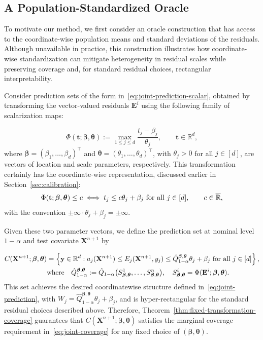 \subsection{A Population-Standardized Oracle}
\label{sec:pop-oracle}

To motivate our method, we first consider an oracle construction that has access to the coordinate-wise population means and standard deviations of the residuals.
Although unavailable in practice, this construction illustrates how coordinate-wise standardization can mitigate heterogeneity in residual scales while preserving coverage and, for standard residual choices, rectangular interpretability.

Consider prediction sets of the form in~\eqref{eq:joint-prediction-scalar}, obtained by transforming the vector-valued residuals $\mathbf E^i$ using the following family of scalarization maps:

\begin{equation}
\Phi(\mathbf t;\boldsymbol\beta,\boldsymbol\theta)
:=\max_{1\leq j\leq d}\frac{t_j-\beta_j}{\theta_j},
\qquad\mathbf t\in\mathbb R^d,
\label{eq:residual-transformation}
\end{equation}
where $\boldsymbol\beta=(\beta_1,\ldots,\beta_d)^\top$ and $\boldsymbol\theta=(\theta_1,\ldots,\theta_d)^\top$, with $\theta_j>0$ for all $j\in[d]$, are vectors of location and scale parameters, respectively.
This transformation certainly has the coordinate-wise representation, discussed earlier in Section~\ref{sec:calibration}:
\[
\Phi(\mathbf t;\boldsymbol\beta,\boldsymbol\theta)\leq c
\iff
t_j\leq c\theta_j+\beta_j\text{ for all }j\in[d],
\qquad c\in\overline{\mathbb{R}},
\]
with the convention $\pm\infty\cdot\theta_j+\beta_j=\pm\infty$.

Given these two parameter vectors, we define the prediction set at nominal level $1-\alpha$ and test covariate $\mathbf X^{n+1}$ by

\begin{equation}\label{eq:set-valued-map}
\begin{aligned}
C(\mathbf X^{n+1};\boldsymbol\beta,\boldsymbol\theta)
&=\left\{\mathbf y \in \mathbb{R}^d:
a_j(\mathbf X^{n+1}) \leq E_j(\mathbf X^{n+1},y_j)
\leq\hat Q^{\boldsymbol\beta,\boldsymbol\theta}_{1-\alpha}\theta_j+\beta_j
\text{ for all }j\in[d]\right\},\\
&\text{where}\quad
\hat Q^{\boldsymbol\beta,\boldsymbol\theta}_{1-\alpha}
:=\hat Q_{1-\alpha}
\bigl(S^1_{\boldsymbol\beta,\boldsymbol\theta},\ldots,
S^n_{\boldsymbol\beta,\boldsymbol\theta}\bigr),\quad 
S^i_{\boldsymbol\beta,\boldsymbol\theta}
=\Phi(\mathbf E^i;\boldsymbol\beta,\boldsymbol\theta).
\end{aligned}
\end{equation}
This set achieves the desired coordinatewise structure defined in~\eqref{eq:joint-prediction}, with $W_j=\hat Q^{\boldsymbol\beta,\boldsymbol\theta}_{1-\alpha}\theta_j+\beta_j$, and is hyper-rectangular for the standard residual choices described above.
Therefore, Theorem~\ref{thm:fixed-transformation-coverage} guarantees that $C(\mathbf X^{n+1};\boldsymbol\beta,\boldsymbol\theta)$ satisfies the marginal coverage requirement in~\eqref{eq:joint-coverage} for any fixed choice of $(\boldsymbol\beta,\boldsymbol\theta)$.

